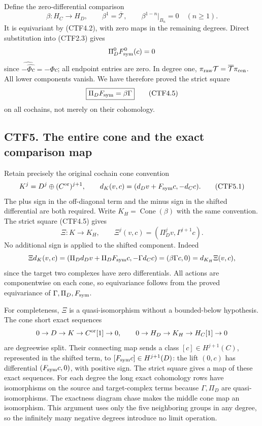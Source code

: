 Define the zero-differential comparison \[
\beta:H_C\to H_D,\qquad
\beta^1=\overline{\mathcal T},\qquad
\beta^{1-n}|_{B_n}=0\quad(n\ge1).
\tag{CTF4.4}
\] It is equivariant by (CTF4.2), with zero maps in the remaining
degrees. Direct substitution into (CTF2.3) gives \[
\Pi_D^0F_{\rm sym}^0(c)=0
\] since \(\widehat{-\widehat{\Phi c}}=-\Phi c\); all endpoint entries
are zero. In degree one,
\(\pi_{\rm raw}\mathcal T=\overline{\mathcal T}\pi_{\rm cen}\). All
lower components vanish. We have therefore proved the strict square \[
\boxed{\Pi_DF_{\rm sym}=\beta\Gamma}
\tag{CTF4.5}
\] on all cochains, not merely on their cohomology.

\subsection{CTF5. The entire cone and the exact comparison
map}\label{ctf5.-the-entire-cone-and-the-exact-comparison-map}

Retain precisely the original cochain cone convention \[
K^j=D^j\oplus(C^{\rm or})^{j+1},\qquad
d_K(v,c)=(d_Dv+F_{\rm sym}c,-d_Cc).
\tag{CTF5.1}
\] The plus sign in the off-diagonal term and the minus sign in the
shifted differential are both required. Write
\(K_H=\operatorname{Cone}(\beta)\) with the same convention. The strict
square (CTF4.5) gives \[
\Xi:K\to K_H,\qquad
\Xi^j(v,c)=(\Pi_D^jv,\Gamma^{j+1}c).
\tag{CTF5.2}
\] No additional sign is applied to the shifted component. Indeed \[
\Xi d_K(v,c)=
(\Pi_Dd_Dv+\Pi_DF_{\rm sym}c,-\Gamma d_Cc)
=(\beta\Gamma c,0)
=d_{K_H}\Xi(v,c),
\] since the target two complexes have zero differentials. All actions
are componentwise on each cone, so equivariance follows from the proved
equivariance of \(\Gamma,\Pi_D,F_{\rm sym}\).

For completeness, \(\Xi\) is a quasi-isomorphism without a bounded-below
hypothesis. The cone short exact sequences \[
0\to D\to K\to C^{\rm or}[1]\to0,\qquad
0\to H_D\to K_H\to H_C[1]\to0
\] are degreewise split. Their connecting map sends a class
\([c]\in H^{j+1}(C)\), represented in the shifted term, to
\([F_{\rm sym}c]\in H^{j+1}(D)\): the lift \((0,c)\) has differential
\((F_{\rm sym}c,0)\), with positive sign. The strict square gives a map
of these exact sequences. For each degree the long exact cohomology rows
have isomorphisms on the source and target-complex terms because
\(\Gamma,\Pi_D\) are quasi-isomorphisms. The exactness diagram chase
makes the middle cone map an isomorphism. This argument uses only the
five neighboring groups in any degree, so the infinitely many negative
degrees introduce no limit operation.

